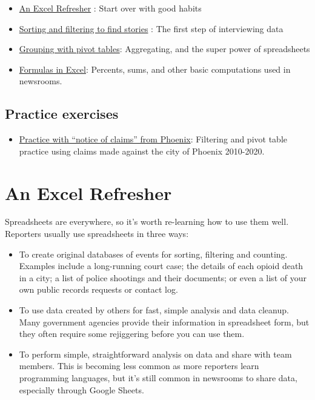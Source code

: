 \documentclass[
  letterpaper,
  DIV=11,
  numbers=noendperiod]{scrreprt}
\providecommand{\tightlist}{%
  \setlength{\itemsep}{0pt}\setlength{\parskip}{0pt}}\usepackage{longtable,booktabs,array}
\begin{document}
\begin{itemize}
\item
  \href{xl-refresher.html}{An Excel Refresher} : Start over with good
  habits
\item
  \href{xl-filter-sort.html}{Sorting and filtering to find stories} :
  The first step of interviewing data
\item
  \href{xl-pivot.html}{Grouping with pivot tables}: Aggregating, and the
  super power of spreadsheets
\item
  \href{xl-formulas.html}{Formulas in Excel}: Percents, sums, and other
  basic computations used in newsrooms.
\end{itemize}

\hypertarget{practice-exercises}{%
\section{Practice exercises}\label{practice-exercises}}

\begin{itemize}
\tightlist
\item
  \href{xl-practice-noc.html}{Practice with ``notice of claims'' from
  Phoenix}: Filtering and pivot table practice using claims made against
  the city of Phoenix 2010-2020.
\end{itemize}


\hypertarget{an-excel-refresher}{%
\chapter{An Excel Refresher}\label{an-excel-refresher}}

Spreadsheets are everywhere, so it's worth re-learning how to use them
well. Reporters usually use spreadsheets in three ways:

\begin{itemize}
\item
  To create original databases of events for sorting, filtering and
  counting. Examples include a long-running court case; the details of
  each opioid death in a city; a list of police shootings and their
  documents; or even a list of your own public records requests or
  contact log.
\item
  To use data created by others for fast, simple analysis and data
  cleanup. Many government agencies provide their information in
  spreadsheet form, but they often require some rejiggering before you
  can use them.
\item
  To perform simple, straightforward analysis on data and share with
  team members. This is becoming less common as more reporters learn
  programming languages, but it's still common in newsrooms to share
  data, especially through Google Sheets.
\end{itemize}
\end{document}
